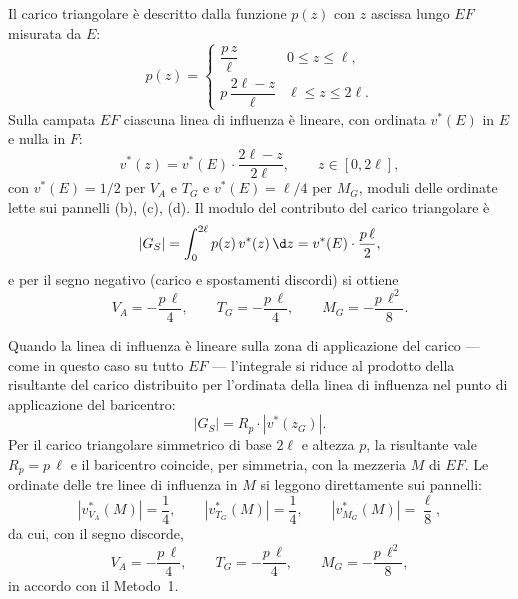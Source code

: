 \begin{esempio}
\begin{svolgimento}
		
		Il carico triangolare è descritto dalla funzione $p(z)$
		con $z$ ascissa lungo $EF$ misurata da $E$:
		\begin{equation*}
			p(z) = \begin{cases}
				\dfrac{p\,z}{\ell} & 0 \le z \le \ell, \\[6pt]
				p\,\dfrac{2\ell - z}{\ell} & \ell \le z \le 2\ell.
			\end{cases}
		\end{equation*}
		Sulla campata $EF$ ciascuna linea di influenza è lineare,
		con ordinata $v^*(E)$ in $E$ e nulla in $F$:
		\begin{equation*}
			v^*(z) = v^*(E) \cdot \dfrac{2\ell - z}{2\ell},
			\qquad z \in [0, 2\ell],
		\end{equation*}
		con $v^*(E) = 1/2$ per $V_A$ e $T_G$ e $v^*(E) = \ell/4$
		per $M_G$, moduli delle ordinate lette sui pannelli
		(b), (c), (d). Il modulo del contributo del carico
		triangolare è
		\begin{equation*}
			|G_S| = \int_0^{2\ell} p(z)\,v^*(z)\,\d z
			= v^*(E) \cdot \frac{p\,\ell}{2},
		\end{equation*}
		e per il segno negativo (carico e spostamenti discordi)
		si ottiene
		\begin{equation*}
			V_A = -\frac{p\,\ell}{4},
			\qquad
			T_G = -\frac{p\,\ell}{4},
			\qquad
			M_G = -\frac{p\,\ell^2}{8}.
		\end{equation*}
		
		
		Quando la linea di influenza è lineare sulla zona di
		applicazione del carico --- come in questo caso su tutto
		$EF$ --- l'integrale si riduce al prodotto della
		risultante del carico distribuito per l'ordinata della
		linea di influenza nel punto di applicazione del
		baricentro:
		\begin{equation*}
			|G_S| = R_p \cdot |v^*(z_G)|.
		\end{equation*}
		Per il carico triangolare simmetrico di base $2\ell$ e
		altezza $p$, la risultante vale $R_p = p\,\ell$ e il
		baricentro coincide, per simmetria, con la mezzeria $M$
		di $EF$. Le ordinate delle tre linee di influenza in $M$
		si leggono direttamente sui pannelli:
		\begin{equation*}
			|v^*_{V_A}(M)| = \frac{1}{4},
			\qquad
			|v^*_{T_G}(M)| = \frac{1}{4},
			\qquad
			|v^*_{M_G}(M)| = \frac{\ell}{8},
		\end{equation*}
		da cui, con il segno discorde,
		\begin{equation*}
			V_A = -\frac{p\,\ell}{4},
			\qquad
			T_G = -\frac{p\,\ell}{4},
			\qquad
			M_G = -\frac{p\,\ell^2}{8},
		\end{equation*}
		in accordo con il Metodo~1.
		

\end{svolgimento}
\end{esempio}
